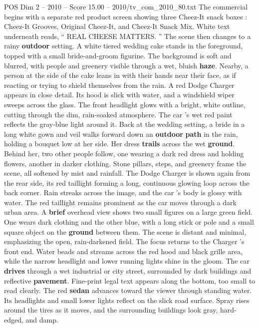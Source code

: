\begin{textsample}{POS Dim 2 – 2010 – Score 15.00 – 2010/tv\_com\_2010\_80.txt}  \label{ex:f2_pos_056}
The commercial begins with a separate red product screen showing three Cheez-It snack boxes : Cheez-It Grooves, Original Cheez-It, and Cheez-It Snack Mix.
White text underneath reads, “ REAL CHEESE MATTERS. ” The scene then changes to a rainy \textbf{outdoor} setting.
A white tiered wedding cake stands in the foreground, topped with a small bride-and-groom figurine.
The background is soft and blurred, with people and greenery visible through a wet, bluish \textbf{haze}.
Nearby, a person at the side of the cake leans in with their hands near their face, as if reacting or trying to shield themselves from the rain.
A red Dodge Charger appears in close detail.
Its hood is slick with water, and a windshield wiper sweeps across the glass.
The front headlight glows with a bright, white outline, cutting through the dim, rain-soaked atmosphere.
The car ’s wet red paint reflects the gray-blue light around it.
Back at the wedding setting, a bride in a long white gown and veil walks forward down an \textbf{outdoor} \textbf{path} in the rain, holding a bouquet low at her side.
Her dress \textbf{trails} across the wet \textbf{ground}.
Behind her, two other people follow, one wearing a dark red dress and holding flowers, another in darker clothing.
Stone pillars, steps, and greenery frame the scene, all softened by mist and rainfall.
The Dodge Charger is shown again from the rear side, its red taillight forming a long, continuous glowing loop across the back corner.
Rain streaks across the image, and the car ’s body is glossy with water.
The red taillight remains prominent as the car moves through a dark urban area.
A \textbf{brief} overhead view shows two small figures on a large green field.
One wears dark clothing and the other blue, with a long stick or pole and a small square object on the \textbf{ground} between them.
The scene is distant and minimal, emphasizing the open, rain-darkened field.
The focus returns to the Charger ’s front end.
Water beads and streams across the red hood and black grille area, while the narrow headlight and lower running lights shine in the gloom.
The car \textbf{drives} through a wet industrial or city street, surrounded by dark buildings and reflective \textbf{pavement}.
Fine-print legal text appears along the bottom, too small to read clearly.
The red \textbf{sedan} advances toward the viewer through standing water.
Its headlights and small lower lights reflect on the slick road surface.
Spray rises around the tires as it moves, and the surrounding buildings look gray, hard-edged, and damp.

\end{textsample}
